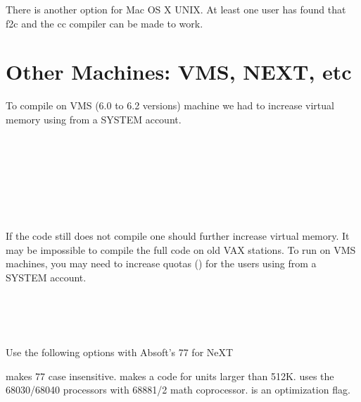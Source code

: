 \documentclass[11pt,oneside]{report} %
\begin{document}
{There is another option for Mac OS X UNIX. At  least one user has found that
f2c and the cc compiler can be made to work.

\section{Other Machines: VMS, NEXT, etc}
\label{sec:VMS-machines}

To compile {\feffcur} on VMS (6.0 to 6.2 versions) machine we had to increase
virtual memory using  from a SYSTEM account.
\begin{center}
  \begin{minipage}[h]{0.7\linewidth}
    \begin{flushleft}
      \\
      \\
      \\
      \\
      \\
      \\
    \end{flushleft}
  \end{minipage}
\end{center}

If the code still does not compile one should further increase virtual
memory.  It may be impossible to compile the full code on old VAX
stations.  To run {\feffcur} on VMS machines, you may need to increase
quotas () for the users using
 from a SYSTEM account.
\begin{center}
  \begin{minipage}[h]{0.7\linewidth}
    \begin{flushleft}
      \\
      \\
      \\
    \end{flushleft}
  \end{minipage}
\end{center}


Use the following options with Absoft's 77 for NeXT
\begin{center}
\end{center}
 makes 77 case insensitive.   makes
a code for units larger than 512K.   uses the 68030/68040
processors with 68881/2 math coprocessor.   is an
optimization flag.


}
\end{document}
